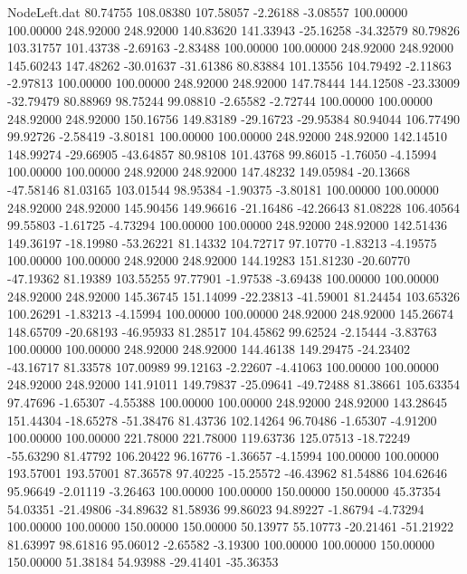 \begin{filecontents}{NodeLeft.dat}
  80.74755  108.08380  107.58057    -2.26188   -3.08557  100.00000  100.00000  248.92000  248.92000  140.83620  141.33943  -25.16258  -34.32579
  80.79826  103.31757  101.43738    -2.69163   -2.83488  100.00000  100.00000  248.92000  248.92000  145.60243  147.48262  -30.01637  -31.61386
  80.83884  101.13556  104.79492    -2.11863   -2.97813  100.00000  100.00000  248.92000  248.92000  147.78444  144.12508  -23.33009  -32.79479
  80.88969   98.75244   99.08810    -2.65582   -2.72744  100.00000  100.00000  248.92000  248.92000  150.16756  149.83189  -29.16723  -29.95384
  80.94044  106.77490   99.92726    -2.58419   -3.80181  100.00000  100.00000  248.92000  248.92000  142.14510  148.99274  -29.66905  -43.64857
  80.98108  101.43768   99.86015    -1.76050   -4.15994  100.00000  100.00000  248.92000  248.92000  147.48232  149.05984  -20.13668  -47.58146
  81.03165  103.01544   98.95384    -1.90375   -3.80181  100.00000  100.00000  248.92000  248.92000  145.90456  149.96616  -21.16486  -42.26643
  81.08228  106.40564   99.55803    -1.61725   -4.73294  100.00000  100.00000  248.92000  248.92000  142.51436  149.36197  -18.19980  -53.26221
  81.14332  104.72717   97.10770    -1.83213   -4.19575  100.00000  100.00000  248.92000  248.92000  144.19283  151.81230  -20.60770  -47.19362
  81.19389  103.55255   97.77901    -1.97538   -3.69438  100.00000  100.00000  248.92000  248.92000  145.36745  151.14099  -22.23813  -41.59001
  81.24454  103.65326  100.26291    -1.83213   -4.15994  100.00000  100.00000  248.92000  248.92000  145.26674  148.65709  -20.68193  -46.95933
  81.28517  104.45862   99.62524    -2.15444   -3.83763  100.00000  100.00000  248.92000  248.92000  144.46138  149.29475  -24.23402  -43.16717
  81.33578  107.00989   99.12163    -2.22607   -4.41063  100.00000  100.00000  248.92000  248.92000  141.91011  149.79837  -25.09641  -49.72488
  81.38661  105.63354   97.47696    -1.65307   -4.55388  100.00000  100.00000  248.92000  248.92000  143.28645  151.44304  -18.65278  -51.38476
  81.43736  102.14264   96.70486    -1.65307   -4.91200  100.00000  100.00000  221.78000  221.78000  119.63736  125.07513  -18.72249  -55.63290
  81.47792  106.20422   96.16776    -1.36657   -4.15994  100.00000  100.00000  193.57001  193.57001   87.36578   97.40225  -15.25572  -46.43962
  81.54886  104.62646   95.96649    -2.01119   -3.26463  100.00000  100.00000  150.00000  150.00000   45.37354   54.03351  -21.49806  -34.89632
  81.58936   99.86023   94.89227    -1.86794   -4.73294  100.00000  100.00000  150.00000  150.00000   50.13977   55.10773  -20.21461  -51.21922
  81.63997   98.61816   95.06012    -2.65582   -3.19300  100.00000  100.00000  150.00000  150.00000   51.38184   54.93988  -29.41401  -35.36353

\end{filecontents}
